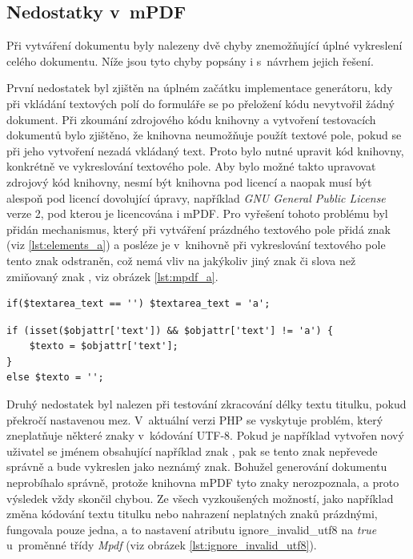 \subsection{Nedostatky v~mPDF}
\label{subsec:nedostatky_v_mpdf}
Při vytváření dokumentu byly nalezeny dvě chyby znemožňující úplné vykreslení celého dokumentu. Níže jsou tyto chyby popsány i s~návrhem jejich řešení.
\par
První nedostatek byl zjištěn na úplném začátku implementace generátoru, kdy při vkládání textových polí do formuláře se po přeložení kódu nevytvořil žádný dokument. Při zkoumání zdrojového kódu knihovny a vytvoření testovacích dokumentů bylo zjištěno, že knihovna neumožňuje použít textové pole, pokud se při jeho vytvoření nezadá vkládaný text. Proto bylo nutné upravit kód knihovny, konkrétně ve vykreslování textového pole. Aby bylo možné takto upravovat zdrojový kód knihovny, nesmí být knihovna pod licencí a naopak musí  být alespoň pod licencí dovolující úpravy, například \textit{GNU General Public License} verze 2, pod kterou je licencována i mPDF. Pro vyřešení tohoto problému byl přidán mechanismus, který při vytváření prázdného textového pole přidá znak  (viz \ref{lst:elements_a}) a posléze je v~knihovně při vykreslování textového pole tento znak odstraněn, což nemá vliv na jakýkoliv jiný znak či slova než zmiňovaný znak , viz obrázek \ref{lst:mpdf_a}.
\begin{lstlisting}[caption = {Dočasné přiřazení znaku \uv{\textbf{a}} do textového pole (Elements.php)}, label = {lst:elements_a}, captionpos=b]
if($textarea_text == '') $textarea_text = 'a';
\end{lstlisting}
\begin{lstlisting}[caption = {Odstranění znaku \uv{\textbf{a}} z~textového pole (Mpdf.php)}, label = {lst:mpdf_a}, captionpos=b]
if (isset($objattr['text']) && $objattr['text'] != 'a') {
	$texto = $objattr['text'];
}
else $texto = '';
\end{lstlisting}
\par
Druhý nedostatek byl nalezen při testování zkracování délky textu titulku, pokud překročí nastavenou mez. V~aktuální verzi PHP se vyskytuje problém, který zneplatňuje některé znaky v~kódování UTF-8. Pokud je například vytvořen nový uživatel se jménem obsahující například znak , pak se tento znak nepřevede správně a bude vykreslen jako neznámý znak. Bohužel generování dokumentu neprobíhalo správně, protože knihovna mPDF tyto znaky nerozpoznala, a proto výsledek vždy skončil chybou. Ze všech vyzkoušených možností, jako například změna kódování textu titulku nebo nahrazení neplatných znaků prázdnými, fungovala pouze jedna, a to nastavení atributu ignore\_invalid\_utf8 na \textit{true} u~proměnné třídy \textit{Mpdf} (viz obrázek \ref{lst:ignore_invalid_utf8}).
